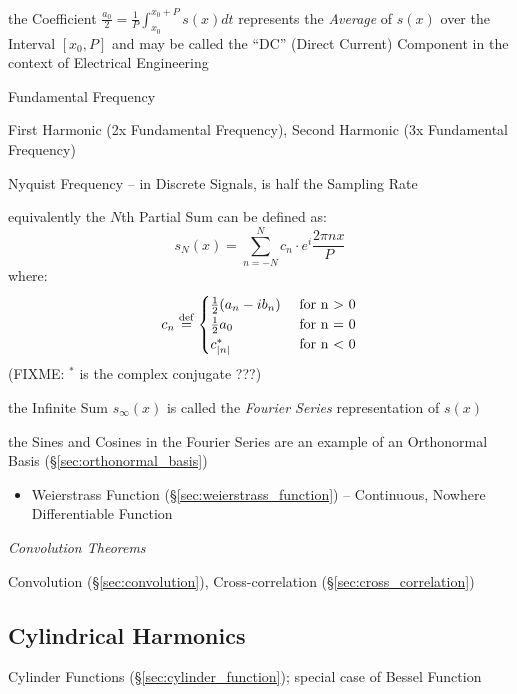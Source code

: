 the Coefficient $\frac{a_0}{2} = \frac{1}{P}\int_{x_0}^{x_0+P}s(x)dt$ represents
the \emph{Average} of $s(x)$ over the Interval $[x_0,P]$ and may be called the
``DC'' (Direct Current) Component in the context of Electrical Engineering

Fundamental Frequency

First Harmonic (2x Fundamental Frequency), Second Harmonic (3x Fundamental
Frequency)

Nyquist Frequency -- in Discrete Signals, is half the Sampling Rate

equivalently the $N$th Partial Sum can be defined as:
\[
  s_N(x) = \sum_{n=-N}^N c_n \cdot e^i\frac{2\pi{nx}}{P}
\]
where:
\[
  c_n \stackrel{\mathrm{def}}= \begin{cases}
    \frac{1}{2}(a_n - ib_n) &\ \text{for n > 0} \\
    \frac{1}{2}a_0          &\ \text{for n = 0} \\
    c_{|n|}^*               &\ \text{for n < 0}
  \end{cases}
\]
(FIXME: $^*$ is the complex conjugate ???)

the Infinite Sum $s_\infty(x)$ is called the \emph{Fourier Series}
representation of $s(x)$

the Sines and Cosines in the Fourier Series are an example of an Orthonormal
Basis (\S\ref{sec:orthonormal_basis})

\begin{itemize}
  \item Weierstrass Function (\S\ref{sec:weierstrass_function}) -- Continuous,
    Nowhere Differentiable Function
\end{itemize}


\emph{Convolution Theorems}

Convolution (\S\ref{sec:convolution}), Cross-correlation
(\S\ref{sec:cross_correlation})



\subsection{Cylindrical Harmonics}\label{sec:cylindrical_harmonics}

\fist Cylinder Functions (\S\ref{sec:cylinder_function}); special case of Bessel
Function



